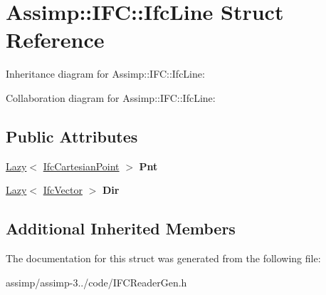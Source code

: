 \hypertarget{struct_assimp_1_1_i_f_c_1_1_ifc_line}{\section{Assimp\+:\+:I\+F\+C\+:\+:Ifc\+Line Struct Reference}
\label{struct_assimp_1_1_i_f_c_1_1_ifc_line}
}


Inheritance diagram for Assimp\+:\+:I\+F\+C\+:\+:Ifc\+Line\+:


Collaboration diagram for Assimp\+:\+:I\+F\+C\+:\+:Ifc\+Line\+:
\subsection*{Public Attributes}
\begin{DoxyCompactItemize}
\item 
\hypertarget{struct_assimp_1_1_i_f_c_1_1_ifc_line_adc129d37211f9a6a3fde054001035147}{\hyperlink{struct_assimp_1_1_s_t_e_p_1_1_lazy}{Lazy}$<$ \hyperlink{struct_assimp_1_1_i_f_c_1_1_ifc_cartesian_point}{Ifc\+Cartesian\+Point} $>$ {\bfseries Pnt}}\label{struct_assimp_1_1_i_f_c_1_1_ifc_line_adc129d37211f9a6a3fde054001035147}

\item 
\hypertarget{struct_assimp_1_1_i_f_c_1_1_ifc_line_afae41830accf8ea48376ed351d30a395}{\hyperlink{struct_assimp_1_1_s_t_e_p_1_1_lazy}{Lazy}$<$ \hyperlink{struct_assimp_1_1_i_f_c_1_1_ifc_vector}{Ifc\+Vector} $>$ {\bfseries Dir}}\label{struct_assimp_1_1_i_f_c_1_1_ifc_line_afae41830accf8ea48376ed351d30a395}

\end{DoxyCompactItemize}
\subsection*{Additional Inherited Members}


The documentation for this struct was generated from the following file\+:\begin{DoxyCompactItemize}
\item 
assimp/assimp-\/3../code/I\+F\+C\+Reader\+Gen.\+h\end{DoxyCompactItemize}

